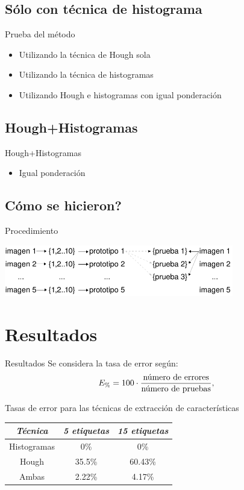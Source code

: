 \documentclass[spanish]{beamer}
\begin{document}
\subsection{Sólo con técnica de histograma}
\begin{frame}{Prueba del método}
  \begin{itemize}
  \item Utilizando la técnica de Hough sola
  \item Utilizando la técnica de histogramas
  \item Utilizando Hough e histogramas con igual ponderación
  \end{itemize}
\end{frame}
%
\subsection{Hough+Histogramas}
\begin{frame}{Hough+Histogramas}
  \begin{itemize}
  \item Igual ponderación
  \end{itemize}
\end{frame}
%
\subsection{Cómo se hicieron?}
\begin{frame}{Procedimiento}
  \begin{center}
    \includegraphics[width=10cm]{../diagramas/generacion-prototipos}
  \end{center}
\end{frame}
%
\section{Resultados}
\begin{frame}{Resultados}
  Se considera la tasa de error según:
  \begin{equation*}
    E_{\%}=100\cdot\frac{\textrm{número de errores}}{\textrm{número de pruebas}},
  \end{equation*}

  Tasas de error para las técnicas de extracción de características
  \begin{center}\begin{tabular}{ccc}
      \hline \emph{{Técnica}} & \emph{5 etiquetas} & \emph{15 etiquetas}\\
      \hline Histogramas & 0\% & 0\%\\
      \hline Hough & 35.5\% & 60.43\%\\
      \hline Ambas & 2.22\% & 4.17\%\\
      \hline
  \end{tabular}\end{center}
\end{frame}
%
\end{document}
